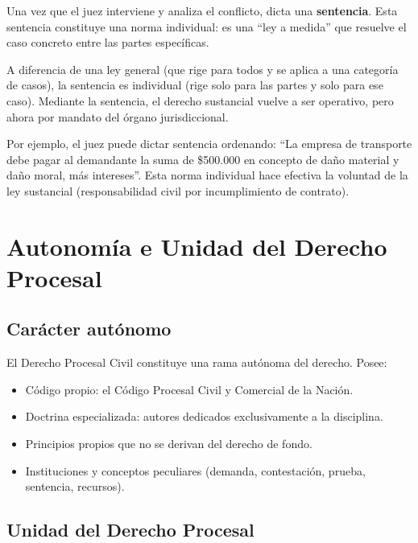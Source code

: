 \documentclass[12pt,oneside]{book}
\begin{document}
Una vez que el juez interviene y analiza el conflicto, dicta una \textbf{sentencia}. Esta sentencia constituye una norma individual: es una ``ley a medida'' que resuelve el caso concreto entre las partes específicas.

A diferencia de una ley general (que rige para todos y se aplica a una categoría de casos), la sentencia es individual (rige solo para las partes y solo para ese caso). Mediante la sentencia, el derecho sustancial vuelve a ser operativo, pero ahora por mandato del órgano jurisdiccional.

Por ejemplo, el juez puede dictar sentencia ordenando: ``La empresa de transporte debe pagar al demandante la suma de \$500.000 en concepto de daño material y daño moral, más intereses''. Esta norma individual hace efectiva la voluntad de la ley sustancial (responsabilidad civil por incumplimiento de contrato).


\chapter{Autonomía e Unidad del Derecho Procesal}

\section{Carácter autónomo}

El Derecho Procesal Civil constituye una rama autónoma del derecho. Posee:

\begin{itemize}
    \item Código propio: el Código Procesal Civil y Comercial de la Nación.
    \item Doctrina especializada: autores dedicados exclusivamente a la disciplina.
    \item Principios propios que no se derivan del derecho de fondo.
    \item Instituciones y conceptos peculiares (demanda, contestación, prueba, sentencia, recursos).
\end{itemize}

\section{Unidad del Derecho Procesal}
\end{document}
